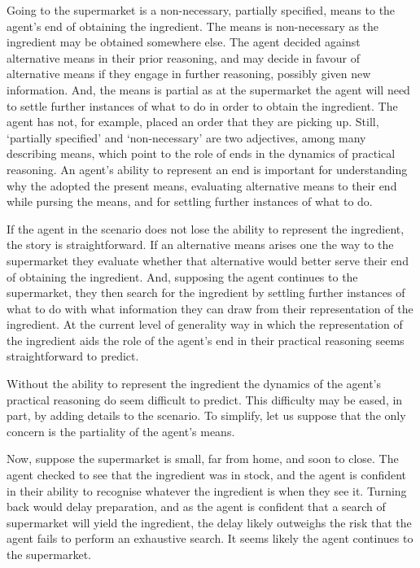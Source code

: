 \documentclass[10pt]{article}
\begin{document}
{
  \color{red}
  Going to the supermarket is a non-necessary, partially specified, means to the agent's end of obtaining the ingredient.
  The means is non-necessary as the ingredient may be obtained somewhere else.
  The agent decided against alternative means in their prior reasoning, and may decide in favour of alternative means if they engage in further reasoning, possibly given new information.
  And, the means is partial as at the supermarket the agent will need to settle further instances of what to do in order to obtain the ingredient.
  The agent has not, for example, placed an order that they are picking up.
  Still, `partially specified' and `non-necessary' are two adjectives, among many describing means, which point to the role of ends in the dynamics of practical reasoning.
  An agent's ability to represent an end is important for understanding why the adopted the present means, evaluating alternative means to their end while pursing the means, and for settling further instances of what to do.

  If the agent in the scenario does not lose the ability to  represent the ingredient, the story is straightforward.
  If an alternative means arises one the way to the supermarket they evaluate whether that alternative would better serve their end of obtaining the ingredient.
  And, supposing the agent continues to the supermarket, they then search for the ingredient by settling further instances of what to do with what information they can draw from their representation of the ingredient.
  At the current level of generality way in which the representation of the ingredient aids the role of the agent's end in their practical reasoning seems straightforward to predict.

  Without the ability to represent the ingredient the dynamics of the agent's practical reasoning do seem difficult to predict.
  This difficulty may be eased, in part, by adding details to the scenario.
  To simplify, let us suppose that the only concern is the partiality of the agent's means.

  Now, suppose the supermarket is small, far from home, and soon to close.
  The agent checked to see that the ingredient was in stock, and the agent is confident in their ability to recognise whatever the ingredient is when they see it.
  Turning back would delay preparation, and as the agent is confident that a search of supermarket will yield the ingredient, the delay likely outweighs the risk that the agent fails to perform an exhaustive search.
  It seems likely the agent continues to the supermarket.

}
\end{document}
